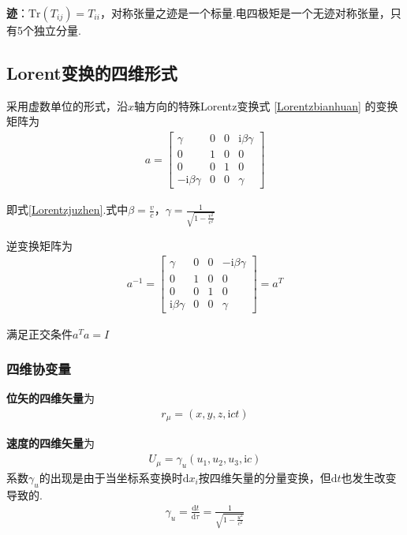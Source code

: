 \documentclass[main.tex]{subfiles}
\begin{document}
\textbf{迹}：$\mathrm{Tr}(T_{ij}) = T_{ii}$，对称张量之迹是一个标量.电四极矩是一个无迹对称张量，只有5个独立分量.

\subsection{Lorent变换的四维形式}
采用虚数单位的形式，沿$x$轴方向的特殊Lorentz变换式 \ref{Lorentzbianhuan} 的变换矩阵为
\begin{align}
    a = \begin{bmatrix}
    \gamma & 0 & 0 & \mathrm{i} \beta \gamma \\
    0 & 1 & 0 & 0\\
    0 & 0 & 1 & 0\\
    -\mathrm{i} \beta \gamma & 0 & 0 & \gamma 
    \end{bmatrix}
\end{align}

即式\ref{Lorentzjuzhen}.式中$\beta = \displaystyle \frac{v}{c}$，$\gamma = \displaystyle \frac{1}{\sqrt{1- \frac{v^2}{c^2}}}$

逆变换矩阵为
\begin{align}
    a^{-1} = \begin{bmatrix}
    \gamma & 0 & 0 & -\mathrm{i} \beta \gamma \\
    0 & 1 & 0 & 0\\
    0 & 0 & 1 & 0\\
    \mathrm{i} \beta \gamma & 0 & 0 & \gamma 
    \end{bmatrix} = a^{T}
\end{align}

满足正交条件$a^{T}a = I$

\subsubsection{四维协变量}
\textbf{位矢的四维矢量}为
\begin{align}
    r_{\mu} = (x,y,z,\mathrm{i}ct)
\end{align}

\textbf{速度的四维矢量}为
\begin{align}
    \label{4-sudu}U_{\mu} = \gamma _{u}(u_{1},u_{2},u_{3},\mathrm{i}c)
\end{align}
系数$\gamma _{u}$的出现是由于当坐标系变换时$\mathrm{d}x_{i}$按四维矢量的分量变换，但$\mathrm{d}t$也发生改变导致的.
\begin{align}
    \gamma _{u} = \frac{\mathrm{d}t}{\mathrm{d}\tau} = \frac{1}{\displaystyle \sqrt{1- \frac{u^2}{c^2}}}
\end{align}
\end{document}
